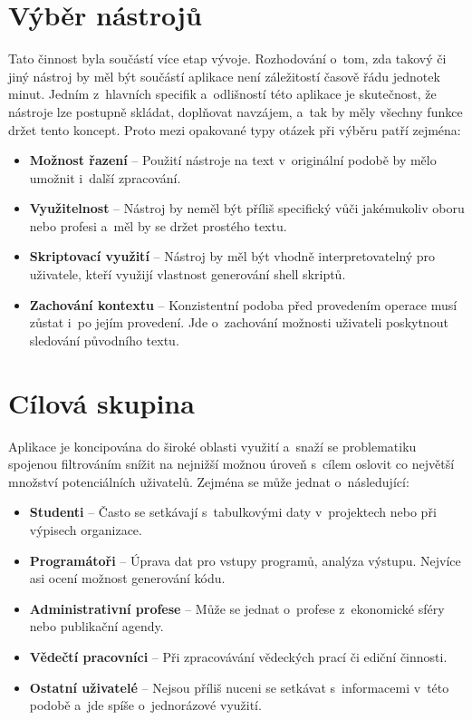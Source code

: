 \section{Výběr nástrojů}
Tato činnost byla součástí více etap vývoje. Rozhodování o~tom, zda takový či jiný nástroj by měl být součástí aplikace není záležitostí časově řádu jednotek minut. Jedním z~hlavních specifik a~odlišností této aplikace je skutečnost, že nástroje lze postupně skládat, doplňovat navzájem, a~tak by měly všechny funkce držet tento koncept. Proto mezi opakované typy otázek při výběru patří zejména:
\begin{itemize}
    \item \textbf{Možnost řazení} -- Použití nástroje na text v~originální podobě by mělo umožnit i~další zpracování.
    \item \textbf{Využitelnost} -- Nástroj by neměl být příliš specifický vůči jakémukoliv oboru nebo profesi a~měl by se držet prostého textu.
    \item \textbf{Skriptovací využití} -- Nástroj by měl být vhodně interpretovatelný pro uživatele, kteří využijí vlastnost generování shell skriptů.
    \item \textbf{Zachování kontextu} -- Konzistentní podoba před provedením operace musí zůstat i~po jejím provedení. Jde o~zachování možnosti uživateli poskytnout sledování původního textu.
\end{itemize}

\section{Cílová skupina}
Aplikace je koncipována do široké oblasti využití a~snaží se problematiku spojenou filtrováním snížit na nejnižší možnou úroveň s~cílem oslovit co největší množství potenciálních uživatelů. Zejména se může jednat o~následující:
\begin{itemize}
    \item \textbf{Studenti} -- Často se setkávají s~tabulkovými daty v~projektech nebo při výpisech organizace.
    \item \textbf{Programátoři} -- Úprava dat pro vstupy programů, analýza výstupu. Nejvíce asi ocení možnost generování kódu.
    \item \textbf{Administrativní profese} -- Může se jednat o~profese z~ekonomické sféry nebo publikační agendy.
    \item \textbf{Vědečtí pracovníci} -- Při zpracovávání vědeckých prací či ediční činnosti.
    \item \textbf{Ostatní uživatelé} -- Nejsou příliš nuceni se setkávat s~informacemi v~této podobě a~jde spíše o~jednorázové využití.
\end{itemize}

